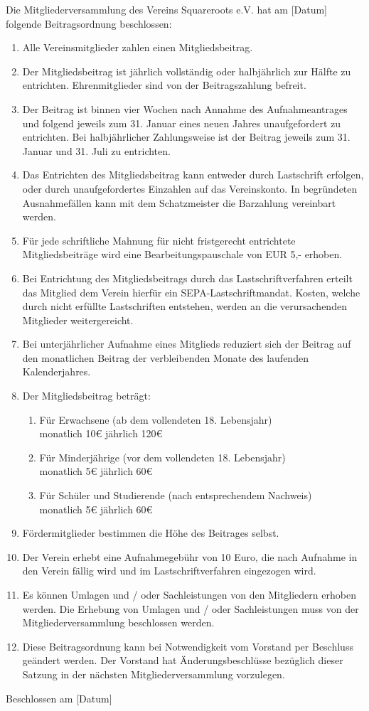 \documentclass[a4paper,ngerman]{scrartcl}
\begin{document}
Die Mitgliederversammlung des Vereins Squareroots e.V. hat am [Datum] folgende Beitragsordnung beschlossen:

\begin{enumerate}
\item Alle Vereinsmitglieder zahlen einen Mitgliedsbeitrag.
\item Der Mitgliedsbeitrag ist jährlich vollständig oder halbjährlich zur Hälfte zu entrichten. Ehrenmitglieder sind von der Beitragszahlung befreit.
\item Der Beitrag ist binnen vier Wochen nach Annahme des Aufnahmeantrages und folgend jeweils zum 31. Januar eines neuen Jahres unaufgefordert zu entrichten. Bei halbjährlicher Zahlungsweise ist der Beitrag jeweils zum 31. Januar und 31. Juli zu entrichten.
\item Das Entrichten des Mitgliedsbeitrag kann entweder durch Lastschrift erfolgen, oder durch unaufgefordertes Einzahlen auf das Vereinskonto. In begründeten Ausnahmefällen kann mit dem Schatzmeister die Barzahlung vereinbart werden.
\item Für jede schriftliche Mahnung für nicht fristgerecht entrichtete Mitgliedsbeiträge wird eine Bearbeitungspauschale von EUR 5,- erhoben.
\item Bei Entrichtung des Mitgliedsbeitrags durch das Lastschriftverfahren erteilt das Mitglied dem Verein hierfür ein SEPA-Lastschriftmandat. Kosten, welche durch nicht erfüllte Lastschriften entstehen, werden an die verursachenden Mitglieder weitergereicht.
\item Bei unterjährlicher Aufnahme eines Mitglieds reduziert sich der Beitrag auf den monatlichen Beitrag der verbleibenden Monate des laufenden Kalenderjahres.
\item Der Mitgliedsbeitrag beträgt:
\begin{enumerate}
\item Für Erwachsene (ab dem vollendeten 18. Lebensjahr)\\
monatlich 10€          jährlich 120€
\item Für Minderjährige (vor dem vollendeten 18. Lebensjahr)\\
monatlich 5€            jährlich 60€
\item Für Schüler und Studierende (nach entsprechendem Nachweis)\\
monatlich 5€            jährlich 60€
\end{enumerate}
\item Fördermitglieder bestimmen die Höhe des Beitrages selbst.
\item Der Verein erhebt eine Aufnahmegebühr von 10 Euro, die nach Aufnahme in den Verein fällig wird und im Lastschriftverfahren eingezogen wird.
\item Es können Umlagen und / oder Sachleistungen von den Mitgliedern erhoben werden. Die Erhebung von Umlagen und / oder Sachleistungen muss von der Mitgliederversammlung beschlossen werden.
\item Diese Beitragsordnung kann bei Notwendigkeit vom Vorstand per Beschluss geändert werden. Der Vorstand hat Änderungsbeschlüsse bezüglich dieser Satzung in der nächsten Mitgliederversammlung vorzulegen.
\end{enumerate}


Beschlossen am [Datum]
\end{document}
